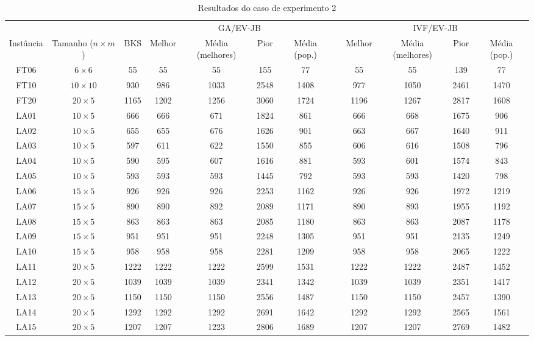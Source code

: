 \begin{sidewaystable}
\caption{Resultados do caso de experimento 2}
\centering
\label{experimento2}
\begin{tabular}{cccccccccccc}
\toprule
& & & \multicolumn{4}{c}{GA/EV-JB} & & \multicolumn{4}{c}{IVF/EV-JB} \\
\cmidrule(c){4-7}
\cmidrule(c){9-12}
Inst\^{a}ncia & Tamanho ($n \times m$) & BKS & Melhor & M\'{e}dia (melhores) & Pior & M\'{e}dia (pop.) & & Melhor & M\'{e}dia (melhores) & Pior & M\'{e}dia (pop.) \\
\midrule
FT06 & $6 \times 6$ & 55 & 55 & 55 & 155 & 77 & & 55 & 55 & 139 & 77 \\
FT10 & $10 \times 10$ & 930 & 986 & 1033 & 2548 & 1408 & & 977 & 1050 & 2461 & 1470 \\
FT20 & $20 \times 5$ & 1165 & 1202 & 1256 & 3060 & 1724 & & 1196 & 1267 & 2817 & 1608 \\
LA01 & $10 \times 5$ & 666 & 666 & 671 & 1824 & 861 & & 666 & 668 & 1675 & 906 \\
LA02 & $10 \times 5$ & 655 & 655 & 676 & 1626 & 901 & & 663 & 667 & 1640 & 911 \\
LA03 & $10 \times 5$ & 597 & 611 & 622 & 1550 & 855 & & 606 & 616 & 1508 & 796 \\
LA04 & $10 \times 5$ & 590 & 595 & 607 & 1616 & 881 & & 593 & 601 & 1574 & 843 \\
LA05 & $10 \times 5$ & 593 & 593 & 593 & 1445 & 792 & & 593 & 593 & 1420 & 798 \\
LA06 & $15 \times 5$ & 926 & 926 & 926 & 2253 & 1162 & & 926 & 926 & 1972 & 1219 \\
LA07 & $15 \times 5$ & 890 & 890 & 892 & 2089 & 1171 & & 890 & 893 & 1955 & 1192 \\
LA08 & $15 \times 5$ & 863 & 863 & 863 & 2085 & 1180 & & 863 & 863 & 2087 & 1178 \\
LA09 & $15 \times 5$ & 951 & 951 & 951 & 2248 & 1305 & & 951 & 951 & 2135 & 1249 \\
LA10 & $15 \times 5$ & 958 & 958 & 958 & 2281 & 1209 & & 958 & 958 & 2065 & 1222 \\
LA11 & $20 \times 5$ & 1222 & 1222 & 1222 & 2599 & 1531 & & 1222 & 1222 & 2487 & 1452 \\
LA12 & $20 \times 5$ & 1039 & 1039 & 1039 & 2341 & 1342 & & 1039 & 1039 & 2351 & 1417 \\
LA13 & $20 \times 5$ & 1150 & 1150 & 1150 & 2556 & 1487 & & 1150 & 1150 & 2457 & 1390 \\
LA14 & $20 \times 5$ & 1292 & 1292 & 1292 & 2691 & 1642 & & 1292 & 1292 & 2565 & 1561 \\
LA15 & $20 \times 5$ & 1207 & 1207 & 1223 & 2806 & 1689 & & 1207 & 1207 & 2769 & 1482 \\
\bottomrule
\end{tabular}
\end{sidewaystable}
